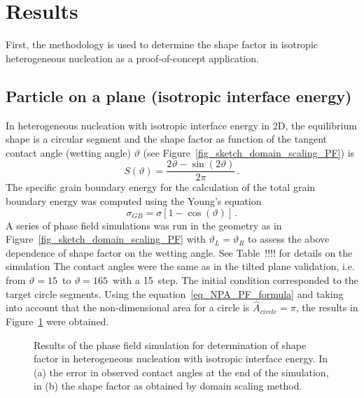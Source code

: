 \section{Results}
First, the methodology is used to determine the shape factor in isotropic heterogeneous nucleation as a proof-of-concept application.


\subsection{Particle on a plane (isotropic interface energy)}
In heterogeneous nucleation with isotropic interface energy in 2D, the equilibrium shape is a circular segment and the shape factor as function of the tangent contact angle (wetting angle) $\vartheta$ (see Figure~\ref{fig_sketch_domain_scaling_PF}) is
\begin{equation}
	S(\vartheta) = \frac{2\vartheta - \sin(2\vartheta)}{2\pi} \,.
\end{equation}
The specific grain boundary energy for the calculation of the total grain boundary energy was computed using the Young's equation
\begin{equation}
	\sigma_{GB} = \sigma[1-\cos(\vartheta)] \,.
\end{equation}
A series of phase field simulations was run in the geometry as in Figure~\ref{fig_sketch_domain_scaling_PF} with $\vartheta_L=\vartheta_R$ to assess the above dependence of shape factor on the wetting angle.  \alert{See Table~!!!! for details on the simulation} The contact angles were the same as in the tilted plane validation, i.e. from $\vartheta=15$\textdegree~to $\vartheta=165$\textdegree~with a 15\textdegree~step. The initial condition corresponded to the target circle segments. Using the equation~\eqref{eq_NPA_PF_formula} and taking into account that the non-dimensional area for a circle is $\hat{A}_{circle}=\pi$, the results in Figure~\ref{fig_result_NPA_PF_S_iso} were obtained.
\begin{figure}
	\centering
	\caption{Results of the phase field simulation for determination of shape factor in heterogeneous nucleation with isotropic interface energy. In (a) the error in observed contact angles at the end of the simulation, in (b) the shape factor as obtained by domain scaling method.}
	\label{fig_result_NPA_PF_S_iso}
\end{figure}

